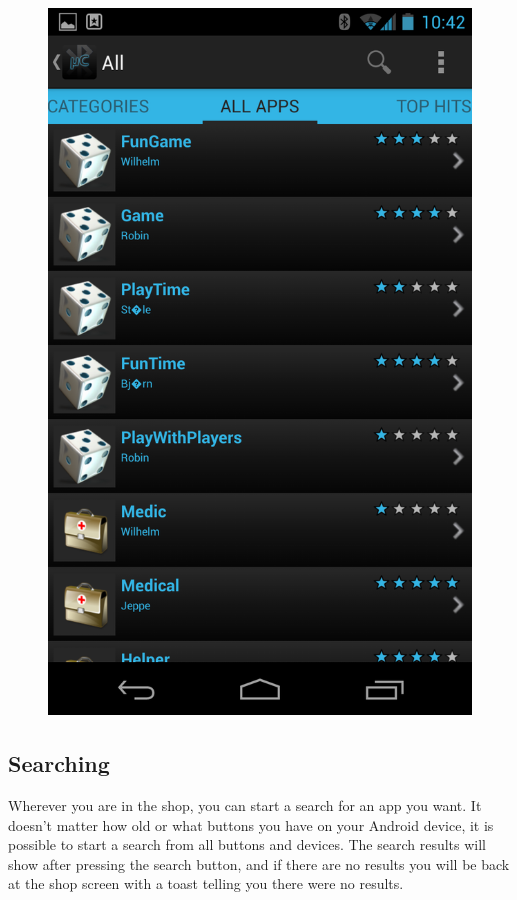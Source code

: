 \newline
\begin{figure}[H]
	\centering
	\includegraphics[scale = 0.3]{images/Screenshots/all_apps.png}
\end{figure}

\subsection{Searching}
Wherever you are in the shop, you can start a search for an app you want. It doesn't matter how old or what buttons you have on your Android device, it is possible to start a search from all buttons and devices. The search results will show after pressing the search button, and if there are no results you will be back at the shop screen with a toast telling you there were no results.

